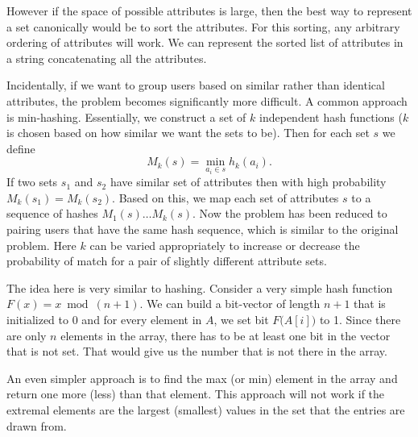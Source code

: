 However if the space of possible attributes is large, then the best way
to represent a set canonically would be to sort the attributes. For this sorting, 
any arbitrary ordering of attributes will work. We can represent the sorted 
list of attributes in a string concatenating all the attributes.

Incidentally, if we want to group users based on similar rather than identical attributes, the
problem becomes significantly more difficult. A common approach is
min-hashing. Essentially, we construct a set of $k$ independent hash functions
($k$ is chosen based on how similar we want the sets to be). Then for
each set $s$ we define 
\[M_k(s) = \min_{a_i \in s} h_k(a_i) . \]
If two sets $s_1$ and $s_2$ have similar set of attributes then with
high probability $M_k(s_1) = M_k(s_2)$. Based on this, we map each set
of attributes $s$ to a sequence of hashes $M_1(s)\ldots M_k(s)$.  Now
the problem has been reduced to pairing users that have the same hash
sequence, which is similar to the original problem. Here $k$ can be varied appropriately to increase or decrease the probability of match for a pair of 
slightly different attribute sets.


The idea here is very similar to hashing. Consider a very simple hash
function $F(x) = x \bmod{(n+1)}$. We can build a bit-vector of length
$n+1$ that is initialized to $0$ and for every element in $A$, we set
bit $F\big(A[i]\big)$ to 1.  Since there are only $n$ elements in the array,
there has to be at least one bit in the vector that is not set. That
would give us the number that is not there in the array.

An even simpler approach is to find the max (or min) element in the array 
and return one more (less) than that element. This approach will not work if the 
extremal elements are the largest (smallest) values in the set
that the entries are drawn from.


